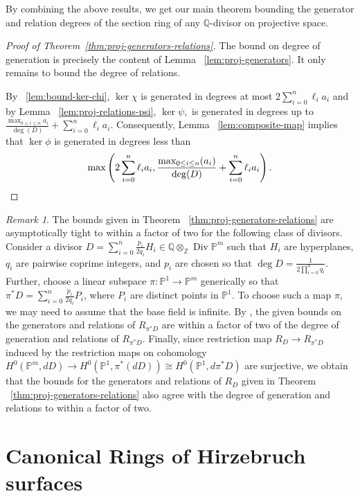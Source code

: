 \documentclass{amsart}
\theoremstyle{plain}
\theoremstyle{definition}
\theoremstyle{remark}
\newtheorem{rem}[thm]{Remark}
\numberwithin{equation}{subsection}
\newcommand\bq{{\mathbb Q}}
\newcommand\bp{{\mathbb P}}
\newcommand\bz{{\mathbb Z}}
\DeclareMathOperator\di{Div}
\newcommand\bida{a}
\begin{document}
By combining the above results, we get our main theorem bounding
the generator and relation degrees of the section ring of any
$\bq$-divisor on projective space.


\begin{proof}[Proof of Theorem~\ref{thm:proj-generators-relations}]
The bound on degree of generation is precisely the content of Lemma 
~\ref{lem:proj-generators}. It only remains to bound the degree of 
relations.

By ~\ref{lem:bound-ker-chi}, $\ker \chi$ is generated in degrees 
at most $2\sum_{i=0}^n \ell_i a_i$ and by Lemma
~\ref{lem:proj-relations-psi}, $\ker \psi,$ is generated in
degrees up to $\frac{\max_{0 \leq i \leq n} \bida_i}{\deg(D)} + \sum_{i=0}^n \ell_i a_i$. 
Consequently, Lemma ~\ref{lem:composite-map} implies that $\ker \phi$
is generated in degrees less than
\[
	\max \left(2 \sum_{i=0}^n \ell_i a_i, \frac{\max_{0\le i \le n}
	(\bida_i)}{\deg(D)} + \sum_{i=0}^n \ell_i a_i \right).
	\qedhere
\]
\end{proof}

\begin{rem}
\label{rem:exact-noneff-bounds}
The bounds given in Theorem 
~\ref{thm:proj-generators-relations} are asymptotically
tight to within a factor of two 
for the following class of divisors. Consider
a divisor 
$ D = \sum_{i=0}^n\frac{p_i}{2q_i}H_i \in \bq \otimes_\bz \di \bp^m$
such that $H_i$ are hyperplanes,  
$q_i$ are pairwise coprime integers, and $p_i$ are chosen
so that $\deg D = \frac{1}{2 \prod_{i=0}^n q_i}$. Further,
choose a linear subspace $\pi: \bp^1 \rightarrow \bp^m$  generically so that
$\pi^* D = \sum_{i=0}^n \frac{p_i}{2q_i}P_i$, 
where $P_i$ are distinct points in $\bp^1$. To choose such a map
$\pi$, we may need to assume that the base field is infinite.
By
\cite[Remark, p. 9]{dorney:canonical},
the given bounds on the generators and relations of
$R_{\pi^*D}$ are within
a factor of two of the degree of generation and relations of
$R_{\pi^*D}$. Finally, since restriction map
$R_D \rightarrow R_{\pi^*D}$ induced by the restriction maps
on cohomology $H^0(\bp^m, dD) \rightarrow H^0(\bp^1, \pi^*(dD))
\cong H^0(\bp^1, d\pi^* D)$ are surjective, we obtain that
the bounds for the generators and relations of $R_D$ given in
Theorem ~\ref{thm:proj-generators-relations} also
agree with the degree of generation and relations 
to within a factor of two.
\end{rem}

\section{Canonical Rings of Hirzebruch surfaces}
\label{sec:hirz}
\end{document}
